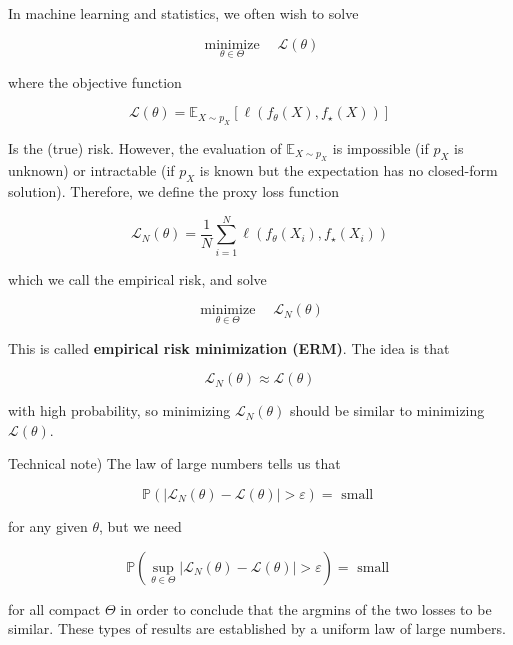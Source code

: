 \begin{definition}
    In machine learning and statistics, we often wish to solve

    $$
    \underset{\theta \in \Theta}{\operatorname{minimize}} \quad \mathcal{L}(\theta)
    $$

    where the objective function

    $$
    \mathcal{L}(\theta)=\mathbb{E}_{X \sim p_{X}}\left[\ell\left(f_{\theta}(X), f_{\star}(X)\right)\right]
    $$

    Is the (true) risk. However, the evaluation of $\mathbb{E}_{X \sim p_{X}}$ is impossible (if $p_{X}$ is unknown) or intractable (if $p_{X}$ is known but the expectation has no closed-form solution). Therefore, we define the proxy loss function

    $$
    \mathcal{L}_{N}(\theta)=\frac{1}{N} \sum_{i=1}^{N} \ell\left(f_{\theta}\left(X_{i}\right), f_{\star}\left(X_{i}\right)\right)
    $$

    which we call the empirical risk, and solve

    $$
    \underset{\theta \in \Theta}{\operatorname{minimize}} \quad \mathcal{L}_{N}(\theta)
    $$

    This is called \textbf{empirical risk minimization (ERM)}. The idea is that

    $$
    \mathcal{L}_{N}(\theta) \approx \mathcal{L}(\theta)
    $$

    with high probability, so minimizing $\mathcal{L}_{N}(\theta)$ should be similar to minimizing $\mathcal{L}(\theta)$.
\end{definition}

\begin{concept}
    Technical note) The law of large numbers tells us that

    $$
    \mathbb{P}\left(\left|\mathcal{L}_{N}(\theta)-\mathcal{L}(\theta)\right|>\varepsilon\right)=\text { small }
    $$

    for any given $\theta$, but we need

    $$
    \mathbb{P}\left(\sup _{\theta \in \Theta}\left|\mathcal{L}_{N}(\theta)-\mathcal{L}(\theta)\right|>\varepsilon\right)=\text { small }
    $$

    for all compact $\Theta$ in order to conclude that the argmins of the two losses to be similar. These types of results are established by a uniform law of large numbers.
\end{concept}

